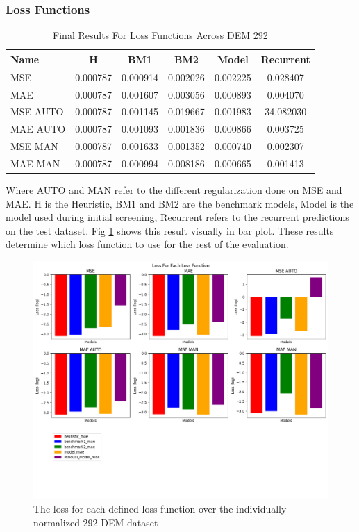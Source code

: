 \subsubsection*{Loss Functions}
\begin{table}[h]
	\centering
	\caption{Final Results For Loss Functions Across DEM 292}
	\label{tab:sample}
	\begin{tabular}{p{3cm}ccccc}
		\toprule
		Name &  H &  BM1 &  BM2 &  Model &  Recurrent \\
		\midrule
		MSE &       0.000787 &        0.000914 &        0.002026 &   0.002225 &            0.028407 \\
		MAE &       0.000787 &        0.001607 &        0.003056 &   0.000893 &            0.004070 \\
		MSE AUTO &       0.000787 &        0.001145 &        0.019667 &   0.001983 &           34.082030 \\
		MAE AUTO &       0.000787 &        0.001093 &        0.001836 &   0.000866 &            0.003725 \\
		MSE MAN &       0.000787 &        0.001633 &        0.001352 &   0.000740 &            0.002307 \\
		MAE MAN &       0.000787 &        0.000994 &        0.008186 &   0.000665 &            0.001413 \\
		\bottomrule
	\end{tabular}
\end{table}
Where AUTO and MAN refer to the different regularization done on MSE and MAE. H is the Heuristic, BM1 and BM2 are the benchmark models, Model is the model used during initial screening, Recurrent refers to the recurrent predictions on the test dataset. Fig \ref{fig:loss-comparison-initial} shows this result visually in bar plot. These results determine which loss function to use for the rest of the evaluation.

\begin{figure}[tbph]
	\centering
	\includegraphics[width=0.9\linewidth, height=0.5\textheight]{"Figures/Results/Initial screening/LOSS PLOTS/Loss comparison"}
	\caption[Loss function performance on the individually normed 292 DEM dataset]{The loss for each defined loss function over the individually normalized 292 DEM dataset}
	\label{fig:loss-comparison-initial}
\end{figure}



